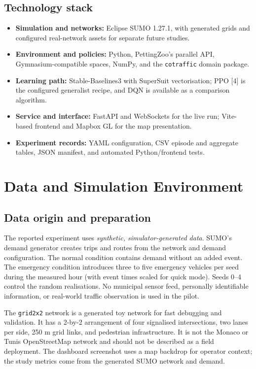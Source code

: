 \documentclass[11pt,a4paper]{article}
\begin{document}
\subsection{Technology stack}
\begin{itemize}
  \item \textbf{Simulation and networks:} Eclipse SUMO 1.27.1, with generated grids and
  configured real-network assets for separate future studies.
  \item \textbf{Environment and policies:} Python, PettingZoo's parallel API,
  Gymnasium-compatible spaces, NumPy, and the \texttt{cotraffic} domain package.
  \item \textbf{Learning path:} Stable-Baselines3 with SuperSuit vectorisation; PPO [4] is
  the configured generalist recipe, and DQN is available as a comparison algorithm.
  \item \textbf{Service and interface:} FastAPI and WebSockets for the live run;
  Vite-based frontend and Mapbox GL for the map presentation.
  \item \textbf{Experiment records:} YAML configuration, CSV episode and aggregate
  tables, JSON manifest, and automated Python/frontend tests.
\end{itemize}

\section{Data and Simulation Environment}
\label{sec:data}
\subsection{Data origin and preparation}
The reported experiment uses \emph{synthetic, simulator-generated data}. SUMO's demand
generator creates trips and routes from the network and demand configuration. The
normal condition contains demand without an added event. The emergency condition
introduces three to five emergency vehicles per seed during the measured hour (with
event times scaled for quick mode). Seeds 0--4 control the random realisations. No
municipal sensor feed, personally identifiable information, or real-world traffic
observation is used in the pilot.

The \texttt{grid2x2} network is a generated toy network for fast debugging and
validation. It has a 2-by-2 arrangement of four signalised intersections, two lanes
per side, 250 m grid links, and pedestrian infrastructure. It is not the Monaco or
Tunis OpenStreetMap network and should not be described as a field deployment. The
dashboard screenshot uses a map backdrop for operator context; the study metrics come
from the generated SUMO network and demand.
\end{document}
